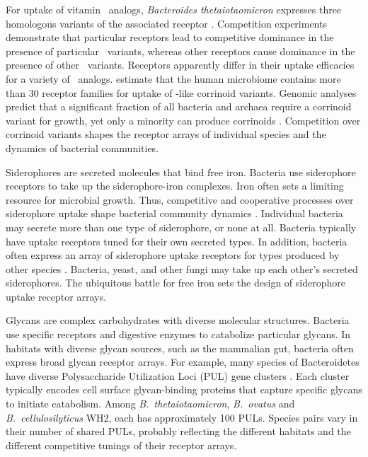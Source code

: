 \documentclass[\mydocfontsize]{article}
\begin{document}
\begin{multicols}{2}
For uptake of vitamin \bt\ analogs, \textit{Bacteroides thetaiotaomicron} expresses three homologous variants of the associated receptor \autocite{degnan14human}. Competition experiments demonstrate that particular receptors lead to competitive dominance in the presence of particular \bt\ variants, whereas other receptors cause dominance in the presence of other \bt\ variants. Receptors apparently differ in their uptake efficacies for a variety of \bt\ analogs. \textcite{degnan14human} estimate that the human microbiome contains more than 30 receptor families for uptake of \bt-like corrinoid variants. Genomic analyses predict that a significant fraction of all bacteria and archaea require a corrinoid variant for growth, yet only a minority can produce corrinoids \autocite{rodionov03comparative,zhang09comparative}. Competition over corrinoid variants shapes the receptor arrays of individual species and the dynamics of bacterial communities. 

Siderophores are secreted molecules that bind free iron. Bacteria use siderophore receptors to take up the siderophore-iron complexes. Iron often sets a limiting resource for microbial growth. Thus, competitive and cooperative processes over siderophore uptake shape bacterial community dynamics \autocite{west07the-social,chakraborty13iron,niehus17the-evolution}. Individual bacteria may secrete more than one type of siderophore, or none at all. Bacteria typically have uptake receptors tuned for their own secreted types. In addition, bacteria often express an array of siderophore uptake receptors for types produced by other species \autocite{loper99utilization}. Bacteria, yeast, and other fungi may take up each other's secreted siderophores. The ubiquitous battle for free iron sets the design of siderophore uptake receptor arrays.

Glycans are complex carbohydrates with diverse molecular structures. Bacteria use specific receptors and digestive enzymes to catabolize particular glycans. In habitats with diverse glycan sources, such as the mammalian gut, bacteria often express broad glycan receptor arrays. For example, many species of Bacteroidetes have diverse Polysaccharide Utilization Loci (PUL) gene clusters \autocite{martens09complex,flint12microbial,grondin17polysaccharide}. Each cluster typically encodes cell surface glycan-binding proteins that capture specific glycans to initiate catabolism. Among \textit{B.~thetaiotaomicron}, \textit{B.~ovatus} and \textit{B.~cellulosilyticus} WH2, each has approximately 100 PULs. Species pairs vary in their number of shared PULs, probably reflecting the different habitats and the different competitive tunings of their receptor arrays. 


\end{multicols}
\end{document}
